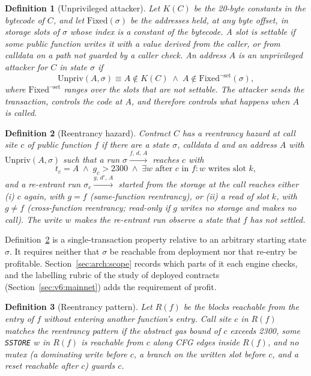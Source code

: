 \documentclass[pdflatex,sn-mathphys]{sn-jnl}
\theoremstyle{thmstyletwo}
\newtheorem{definition}{Definition}
\theoremstyle{thmstyletwo}
\begin{document}
\begin{definition}[Unprivileged attacker]\label{def:attacker}
Let $K(C)$ be the 20-byte constants in the bytecode of $C$, and let $\mathrm{Fixed}(\sigma)$ be the addresses held, at any byte offset, in storage slots of $\sigma$ whose index is a constant of the bytecode. A slot is \emph{settable} if some public function writes it with a value derived from the caller, or from calldata on a path not guarded by a caller check. An address $A$ is an unprivileged attacker for $C$ in state $\sigma$ if
\begin{equation}
    \mathrm{Unpriv}(A, \sigma) \equiv A \notin K(C) \;\land\; A \notin \mathrm{Fixed}^{\neg\mathrm{set}}(\sigma),
\end{equation}
where $\mathrm{Fixed}^{\neg\mathrm{set}}$ ranges over the slots that are not settable. The attacker sends the transaction, controls the code at $A$, and therefore controls what happens when $A$ is called.
\end{definition}

\begin{definition}[Reentrancy hazard]\label{def:reentrancy}
Contract $C$ has a reentrancy hazard at call site $c$ of public function $f$ if there are a state $\sigma$, calldata $d$ and an address $A$ with $\mathrm{Unpriv}(A, \sigma)$ such that a run $\sigma \xrightarrow{f,\,d,\,A}$ reaches $c$ with
\begin{equation}
    t_c = A \;\land\; g_c > 2300 \;\land\; \exists w \text{ after } c \text{ in } f: w \text{ writes slot } k,
\end{equation}
and a re-entrant run $\sigma_c \xrightarrow{g,\,d',\,A}$ started from the storage at the call reaches either (i) $c$ again, with $g = f$ (\emph{same-function} reentrancy), or (ii) a read of slot $k$, with $g \neq f$ (\emph{cross-function} reentrancy; \emph{read-only} if $g$ writes no storage and makes no call). The write $w$ makes the re-entrant run observe a state that $f$ has not settled.
\end{definition}

Definition~\ref{def:reentrancy} is a single-transaction property relative to an arbitrary starting state $\sigma$. It requires neither that $\sigma$ be reachable from deployment nor that re-entry be profitable. Section~\ref{sec:arch:scope} records which parts of it each engine checks, and the labelling rubric of the study of deployed contracts (Section~\ref{sec:v6:mainnet}) adds the requirement of profit.

\begin{definition}[Reentrancy pattern]\label{def:pattern}
Let $R(f)$ be the blocks reachable from the entry of $f$ without entering another function's entry. Call site $c$ in $R(f)$ matches the reentrancy pattern if the abstract gas bound of $c$ exceeds 2300, some \texttt{SSTORE} $w$ in $R(f)$ is reachable from $c$ along CFG edges inside $R(f)$, and no mutex (a dominating write before $c$, a branch on the written slot before $c$, and a reset reachable after $c$) guards $c$.
\end{definition}
\end{document}
